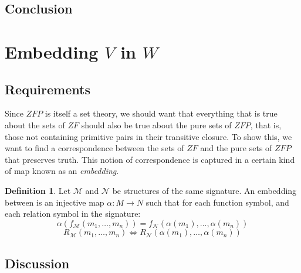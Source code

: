 \documentclass[11pt]{report}
\theoremstyle{definition}
\theoremstyle{theorem}
\theoremstyle{lemma}
\newtheorem{definition}{Definition}[section]
\begin{document}
\subsection{Conclusion}

\section{Embedding $V$ in $W$}
\subsection{Requirements}

Since $\mathit{ZFP}$ is itself a set theory, we should want that everything that is true about the sets of $\mathit{ZF}$ should also be true about the pure sets of $\mathit{ZFP}$, that is, those not containing primitive pairs in their transitive closure. To show this, we want to find a correspondence between the sets of $\mathit{ZF}$ and the pure sets of $\mathit{ZFP}$ that preserves truth. This notion of correspondence is captured in a certain kind of map known as an \emph{embedding}.

\begin{definition}\label{embedding}
Let $\mathcal{M}$ and $\mathcal{N}$ be structures of the same signature. An embedding between is an injective map $\alpha:M\to N$ such that for each function symbol, and each relation symbol in the signature:
 $$\alpha(f_{\mathcal{M}}(m_1,\ldots,m_n)) = f_{\mathcal{N}}(\alpha(m_1),\ldots,\alpha(m_n))$$
 $$R_\mathcal{M}(m_1,\ldots,m_n) \iff R_\mathcal{N}(\alpha(m_1),\ldots,\alpha(m_n))$$
\end{definition}

\subsection{Discussion}
\end{document}
